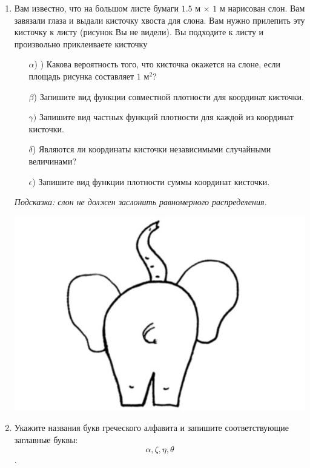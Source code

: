 \documentclass[12pt, a4paper]{article}\usepackage[]{graphicx}\usepackage[]{color}
\begin{document}
\begin{enumerate}
					\item
					Вам известно, что на большом листе бумаги $1.5$ м $\times$ $1$ м нарисован слон. Вам завязали
					глаза и выдали кисточку хвоста для слона. Вам нужно прилепить эту кисточку к
					листу (рисунок Вы не видели). Вы подходите к листу и произвольно приклеиваете
					кисточку
					\begin{enumerate}
						\item[$\alpha$)] ) Какова вероятность того, что кисточка окажется на слоне, если площадь рисунка составляет $1$ м$^2$?
						\item[$\beta$)]  Запишите вид функции совместной плотности для координат кисточки.
						\item[$\gamma)$] Запишите вид частных функций плотности для каждой из координат кисточки.
						\item[$\delta$)] Являются ли координаты кисточки независимыми случайными величинами?
						\item[$\epsilon$)] Запишите вид функции плотности суммы координат кисточки.
					\end{enumerate}
					\textit{Подсказка: слон не должен заслонить равномерного распределения.}

					\begin{center}
						\includegraphics[scale=1.5]{images/slon.jpg}
					\end{center}

					\item
					Укажите названия букв греческого алфавита и запишите соответствующие заглавные буквы:
					\[\alpha, \zeta, \eta, \theta\].

				\end{enumerate}
\end{document}
